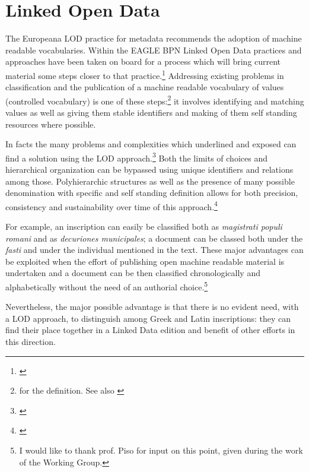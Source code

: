 \documentclass[amsthm,ebook]{saparticle}
\begin{document}
\section{Linked Open Data}
\noindent The Europeana LOD practice for metadata recommends the adoption of machine readable vocabularies. Within the EAGLE BPN Linked Open Data practices and approaches have been taken on board for a process which will bring current material some steps closer to that practice.\footnote{\citet{Bizer2009}} Addressing existing problems in classification and the publication of a machine readable vocabulary of values (controlled vocabulary) is one of these steps:\footnote{\citet[4-5]{Harper2012} for the definition. See also \citet{Isaac2012}} it involves identifying and matching values as well as giving them stable identifiers and making of them self standing resources where possible.

In facts the many problems and complexities which \citet{Manzella1987} underlined and exposed can find a solution using the LOD approach.\footnote{\citet{Bizer2009}} Both the limits of choices and hierarchical organization can be bypassed using unique identifiers and relations among those. Polyhierarchic structures as well as the presence of many possible denomination with specific and self standing definition allows for both precision, consistency and sustainability over time of this approach.\footnote{\citet{Harpring2010}} 

For example, an inscription can easily be classified both as \emph{magistrati populi romani} and as \emph{decuriones municipales}; a document can be classed both under the \emph{fasti} and under the individual mentioned in the text. These major advantages can be exploited when the effort of publishing open machine readable material is undertaken and a document can be then classified chronologically and alphabetically without the need of an authorial choice.\footnote{I would like to thank prof. Piso for input on this point, given during the work of the Working Group.}

Nevertheless, the major possible advantage is that there is no evident need, with a LOD approach, to distinguish among Greek and Latin inscriptions: they can find their place together in a Linked Data  edition and benefit of other efforts in this direction.
\end{document}
